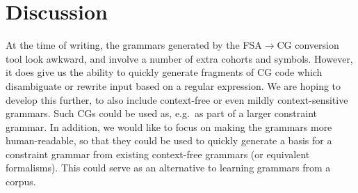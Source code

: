 \documentclass[11pt]{article}
\begin{document}
\section{Discussion}

At the time of writing, the grammars generated by the FSA$\rightarrow$CG
conversion tool look awkward, and involve a number of extra cohorts and symbols.
However, it does give us the ability to quickly generate fragments of CG code
which disambiguate or rewrite input based on a regular expression.
We are hoping to develop this further, to also include context-free or even
mildly context-sensitive grammars.
Such CGs could be used as, e.g.\ as part of a larger constraint grammar.
In addition, we would like to focus on making the grammars more human-readable,
so that they could be used to quickly generate a basis for a constraint grammar
from existing context-free grammars (or equivalent formalisms).
This could serve as an alternative to learning grammars from a corpus.



\end{document}
